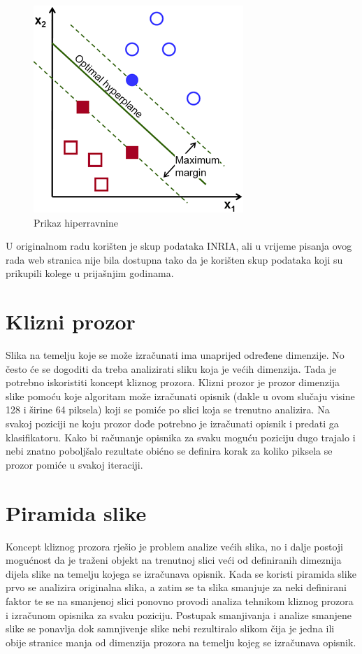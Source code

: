 \documentclass[times, utf8, zavrsni]{fer}
\begin{document}
\begin{figure}[htb]
	\centering
	\includegraphics[width=0.5\linewidth]{figures/optimal-hyperplane.png}
	\caption{Prikaz hiperravnine\protect\footnotemark}
	\label{fig:hyperplane}
\end{figure}


U originalnom radu \cite{dalal2005histograms} korišten je skup podataka INRIA\protect\footnotemark, ali u vrijeme pisanja ovog rada web stranica nije bila dostupna tako da je korišten skup podataka koji su prikupili kolege u prijašnjim godinama.


\section{Klizni prozor}
Slika na temelju koje se može izračunati ima unaprijed određene dimenzije. No često će se dogoditi da treba analizirati sliku koja je većih dimenzija. Tada je potrebno iskoristiti koncept kliznog prozora. Klizni prozor je prozor dimenzija slike pomoću koje algoritam može izračunati opisnik (dakle u ovom slučaju visine 128 i širine 64 piksela) koji se pomiće po slici koja se trenutno analizira. Na svakoj poziciji ne koju prozor dođe potrebno je izračunati opisnik i predati ga klasifikatoru. Kako bi računanje opisnika za svaku moguću poziciju dugo trajalo i nebi znatno poboljšalo rezultate obićno se definira korak za koliko piksela se prozor pomiće u svakoj iteraciji.

\section{Piramida slike}
Koncept kliznog prozora rješio je problem analize većih slika, no i dalje postoji mogućnost da je traženi objekt na trenutnoj slici veći od definiranih dimeznija dijela slike na temelju kojega se izračunava opisnik. Kada se koristi piramida slike prvo se analizira originalna slika, a zatim se ta slika smanjuje za neki definirani faktor te se na smanjenoj slici ponovno provodi analiza tehnikom kliznog prozora i izračunom opisnika za svaku poziciju. Postupak smanjivanja i analize smanjene slike se ponavlja dok samnjivenje slike nebi rezultiralo slikom čija je jedna ili obije stranice manja od dimenzija prozora na temelju kojeg se izračunava opisnik.
\end{document}
